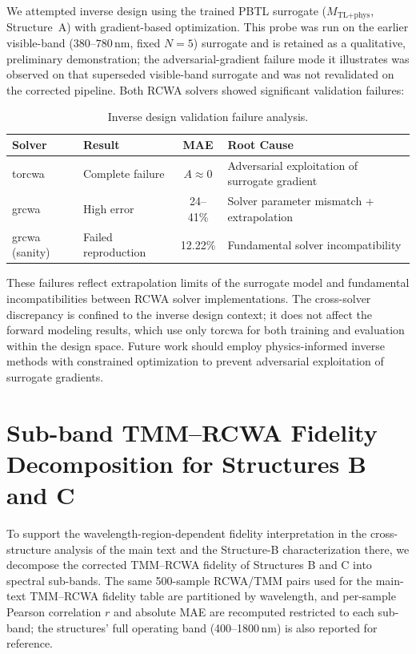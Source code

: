 \documentclass[11pt]{article}
\newcommand{\Mtlphys}{\ensuremath{M_\text{TL+phys}}}
\begin{document}
We attempted inverse design using the trained PBTL surrogate ($\Mtlphys$, Structure~A) with gradient-based optimization. This probe was run on the earlier visible-band ($380$--$780$\,nm, fixed $N{=}5$) surrogate and is retained as a qualitative, preliminary demonstration; the adversarial-gradient failure mode it illustrates was observed on that superseded visible-band surrogate and was not revalidated on the corrected pipeline. Both RCWA solvers showed significant validation failures:

\begin{table}[htbp]\centering\small
\caption{Inverse design validation failure analysis.}
\label{tab:inverse_design}
\begin{tabular}{llcl}\toprule
\textbf{Solver} & \textbf{Result} & \textbf{MAE} & \textbf{Root Cause}\\\midrule
torcwa          & Complete failure   & $A \approx 0$  & Adversarial exploitation of surrogate gradient\\
grcwa           & High error         & 24--41\%       & Solver parameter mismatch + extrapolation\\
grcwa (sanity)  & Failed reproduction & 12.22\%        & Fundamental solver incompatibility\\\bottomrule
\end{tabular}
\end{table}

These failures reflect extrapolation limits of the surrogate model and fundamental incompatibilities between RCWA solver implementations. The cross-solver discrepancy is confined to the inverse design context; it does not affect the forward modeling results, which use only torcwa for both training and evaluation within the design space. Future work should employ physics-informed inverse methods with constrained optimization to prevent adversarial exploitation of surrogate gradients.


\section{Sub-band TMM--RCWA Fidelity Decomposition for Structures B and C}
\label{sec:si_subband}

To support the wavelength-region-dependent fidelity interpretation in
the cross-structure analysis of the main text and the Structure-B
characterization there, we decompose the corrected TMM--RCWA fidelity
of Structures B and C into spectral sub-bands. The same 500-sample
RCWA/TMM pairs used for the main-text TMM--RCWA fidelity table are partitioned by
wavelength, and per-sample Pearson correlation $r$ and absolute MAE are
recomputed restricted to each sub-band; the structures' full operating
band (400--1800\,nm) is also reported for reference.
\end{document}
